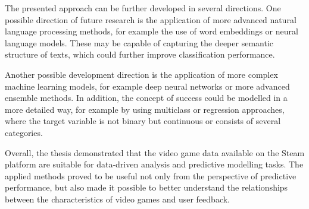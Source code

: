 The presented approach can be further developed in several directions.
One possible direction of future research is the application
of more advanced natural language processing methods,
for example the use of word embeddings or neural language models.
These may be capable of capturing the deeper semantic structure of texts,
which could further improve classification performance.

Another possible development direction is the application
of more complex machine learning models,
for example deep neural networks or more advanced ensemble methods.
In addition, the concept of success could be modelled in a more detailed way,
for example by using multiclass or regression approaches,
where the target variable is not binary
but continuous or consists of several categories.

Overall, the thesis demonstrated
that the video game data available on the Steam platform
are suitable for data-driven analysis and predictive modelling tasks.
The applied methods proved to be useful not only from the perspective of predictive performance,
but also made it possible to better understand the relationships
between the characteristics of video games
and user feedback.
